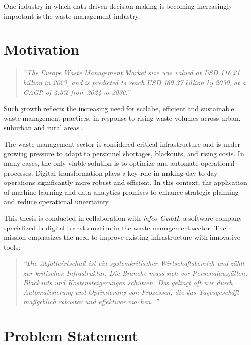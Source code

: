 \documentclass[a4paper,12pt,twoside]{scrreprt}
\begin{document}
One industry in which data-driven decision-making is becoming increasingly
important is the
waste management industry.

\section{Motivation}
\begin{quote}
  \textit{
    ``The Europe Waste Management Market size was valued at USD 116.21
    billion in
    2023, and is predicted to reach USD 169.37 billion by 2030, at a CAGR of
    4.5\% from 2024 to 2030.''\cite{noauthor_europe_nodate}}
\end{quote}

Such growth reflects the increasing need for scalabe, efficient and sustainable
waste
management practices, in response to rising waste volumes across urban,
suburban and rural areas \cite{noauthor_solid_nodate}.

The waste management sector is considered critical infrastructure and is under
growing pressure to adapt to personnel shortages, blackouts, and rising costs.
In many cases, the only viable solution is to optimize and automate operational
processes. Digital transformation plays a key role in making day-to-day
operations significantly more robust and
efficient.\cite{noauthor_gemeinsam_nodate}
In this context, the application of machine learning and data analytics
promises to enhance strategic planning and reduce operational uncertainty.

This thesis is conducted in collaboration with \textit{infeo GmbH}, a software
company specialized in digital transformation in the waste management
sector. Their mission emphasizes the need to improve existing infrastructure
with innovative tools:

\begin{quotation}
  \textit{
    ``Die Abfallwirtschaft ist ein systemkritischer Wirtschaftsbereich und
    zählt
    zur kritischen Infrastruktur. Die Branche muss sich vor Personalausfällen,
    Blackouts und Kostensteigerungen schützen. Das gelingt oft nur durch
    Automatisierung und Optimierung von Prozessen, die das Tagesgeschäft
    maßgeblich robuster und effektiver machen.
    ''\cite{noauthor_gemeinsam_nodate}}
\end{quotation}

\section{Problem Statement}
\end{document}
